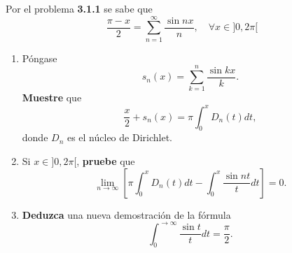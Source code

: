 \documentclass[12pt]{report}
\theoremstyle{largebreak}
\begin{document}
    \begin{excer}
        Por el problema \textbf{3.1.1} se sabe que
        \begin{equation*}
            \frac{\pi-x}{2}=\sum_{ n=1}^\infty\frac{\sin nx}{n},\quad\forall x\in]0,2\pi[
        \end{equation*}
        \begin{enumerate}
            \item Póngase
            \begin{equation*}
                s_n(x)=\sum_{k=1}^n \frac{\sin kx}{k}.
            \end{equation*}
            \textbf{Muestre} que
            \begin{equation*}
                \frac{x}{2}+s_n(x)=\pi\int_0^x D_n(t)dt,
            \end{equation*}
            donde $D_n$ es el núcleo de Dirichlet.
            \item Si $x\in]0,2\pi[$, \textbf{pruebe} que
            \begin{equation*}
                \lim_{ n\rightarrow\infty}\left[\pi\int_0^x D_n(t)dt- \int_0^x\frac{\sin nt}{t}dt \right]=0.
            \end{equation*}
            \item \textbf{Deduzca} una nueva demostración de la fórmula
            \begin{equation*}
                \int_0^{\rightarrow\infty}\frac{\sin t}{t}dt=\frac{\pi}{2}.
            \end{equation*}
        \end{enumerate}
    \end{excer}
\end{document}

